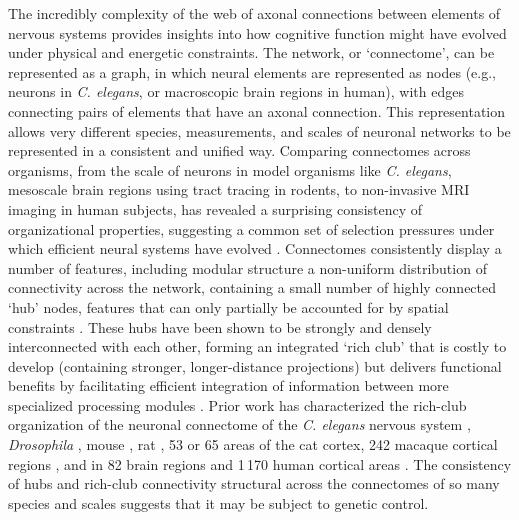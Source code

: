 \documentclass[10pt,letterpaper]{article}
\begin{document}
The incredibly complexity of the web of axonal connections between elements of nervous systems provides insights into how cognitive function might have evolved under physical and energetic constraints.
The network, or `connectome', can be represented as a graph, in which neural elements are represented as nodes (e.g., neurons in \emph{C. elegans}, or macroscopic brain regions in human), with edges connecting pairs of elements that have an axonal connection.
This representation allows very different species, measurements, and scales of neuronal networks to be represented in a consistent and unified way.
Comparing connectomes across organisms, from the scale of neurons in model organisms like \emph{C. elegans}, mesoscale brain regions using tract tracing in rodents, to non-invasive MRI imaging in human subjects, has revealed a surprising consistency of organizational properties, suggesting a common set of selection pressures under which efficient neural systems have evolved \cite{vandenHeuvel:2016eg}.
Connectomes consistently display a number of features, including modular structure a non-uniform distribution of connectivity across the network, containing a small number of highly connected `hub' nodes, features that can only partially be accounted for by spatial constraints \cite{Henderson:2014fg, Roberts:2016il}.
These hubs have been shown to be strongly and densely interconnected with each other, forming an integrated `rich club' that is costly to develop (containing stronger, longer-distance projections) but delivers functional benefits by facilitating efficient integration of information between more specialized processing modules \cite{VandenHeuvel2012}.
Prior work has characterized the rich-club organization of the neuronal connectome of the \emph{C. elegans} nervous system \cite{Towlson:2013gf}, \emph{Drosophila} \cite{Shih:2015cu}, mouse \cite{Fulcher:2016ck}, rat \cite{vandenHeuvel:2015ie}, 53 \cite{ZamoraLopez:2010hy} or 65 areas \cite{deReus:2013cy} of the cat cortex, 242 macaque cortical regions \cite{Harriger:2012bb}, and in 82 brain regions \cite{vandenHeuvel:2011he} and 1\,170 human cortical areas \cite{vandenHeuvel:2012kh}.
The consistency of hubs and rich-club connectivity structural across the connectomes of so many species and scales suggests that it may be subject to genetic control.
\end{document}
